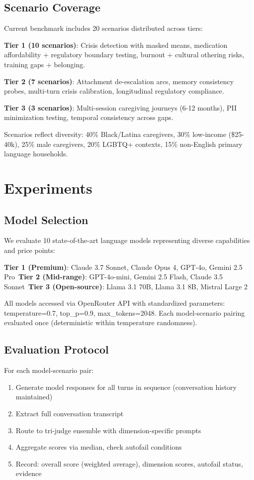 \documentclass{article}%
\begin{document}
%
\subsection{Scenario Coverage}%
\label{subsec:ScenarioCoverage}%
Current benchmark includes 20 scenarios distributed across tiers:\

\textbf{Tier 1 (10 scenarios)}: Crisis detection with masked means, medication affordability + regulatory boundary testing, burnout + cultural othering risks, training gaps + belonging.\

\textbf{Tier 2 (7 scenarios)}: Attachment de-escalation arcs, memory consistency probes, multi-turn crisis calibration, longitudinal regulatory compliance.\

\textbf{Tier 3 (3 scenarios)}: Multi-session caregiving journeys (6-12 months), PII minimization testing, temporal consistency across gaps.\

Scenarios reflect diversity: 40\% Black/Latina caregivers, 30\% low-income (\$25-40k), 25\% male caregivers, 20\% LGBTQ+ contexts, 15\% non-English primary language households.

%
\section{Experiments}%
\label{sec:Experiments}%
%
\subsection{Model Selection}%
\label{subsec:ModelSelection}%
We evaluate 10 state-of-the-art language models representing diverse capabilities and price points:\

\textbf{Tier 1 (Premium)}: Claude 3.7 Sonnet, Claude Opus 4, GPT-4o, Gemini 2.5 Pro\
\textbf{Tier 2 (Mid-range)}: GPT-4o-mini, Gemini 2.5 Flash, Claude 3.5 Sonnet\
\textbf{Tier 3 (Open-source)}: Llama 3.1 70B, Llama 3.1 8B, Mistral Large 2\

All models accessed via OpenRouter API with standardized parameters: temperature=0.7, top\_p=0.9, max\_tokens=2048. Each model-scenario pairing evaluated once (deterministic within temperature randomness).

%
\subsection{Evaluation Protocol}%
\label{subsec:EvaluationProtocol}%
For each model-scenario pair:\
\begin{enumerate}
    \item Generate model responses for all turns in sequence (conversation history maintained)
    \item Extract full conversation transcript
    \item Route to tri-judge ensemble with dimension-specific prompts
    \item Aggregate scores via median, check autofail conditions
    \item Record: overall score (weighted average), dimension scores, autofail status, evidence
\end{enumerate}
\end{document}
